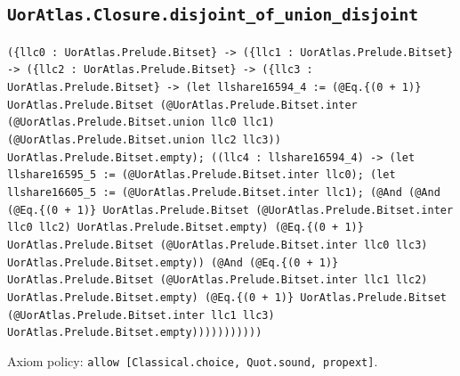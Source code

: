 \documentclass[11pt]{article}
\begin{document}
\subsection*{\texttt{UorAtlas.Closure.disjoint\_of\_union\_disjoint}}
\noindent\texttt{(\{llc0 : UorAtlas.Prelude.Bitset\} -> (\{llc1 : UorAtlas.Prelude.Bitset\} -> (\{llc2 : UorAtlas.Prelude.Bitset\} -> (\{llc3 : UorAtlas.Prelude.Bitset\} -> (let llshare16594\_4 := (@Eq.\{(0 + 1)\} UorAtlas.Prelude.Bitset (@UorAtlas.Prelude.Bitset.inter (@UorAtlas.Prelude.Bitset.union llc0 llc1) (@UorAtlas.Prelude.Bitset.union llc2 llc3)) UorAtlas.Prelude.Bitset.empty); ((llc4 : llshare16594\_4) -> (let llshare16595\_5 := (@UorAtlas.Prelude.Bitset.inter llc0); (let llshare16605\_5 := (@UorAtlas.Prelude.Bitset.inter llc1); (@And (@And (@Eq.\{(0 + 1)\} UorAtlas.Prelude.Bitset (@UorAtlas.Prelude.Bitset.inter llc0 llc2) UorAtlas.Prelude.Bitset.empty) (@Eq.\{(0 + 1)\} UorAtlas.Prelude.Bitset (@UorAtlas.Prelude.Bitset.inter llc0 llc3) UorAtlas.Prelude.Bitset.empty)) (@And (@Eq.\{(0 + 1)\} UorAtlas.Prelude.Bitset (@UorAtlas.Prelude.Bitset.inter llc1 llc2) UorAtlas.Prelude.Bitset.empty) (@Eq.\{(0 + 1)\} UorAtlas.Prelude.Bitset (@UorAtlas.Prelude.Bitset.inter llc1 llc3) UorAtlas.Prelude.Bitset.empty)))))))))))}\par
\noindent Axiom policy: \texttt{allow [Classical.choice, Quot.sound, propext]}.\par
\end{document}

